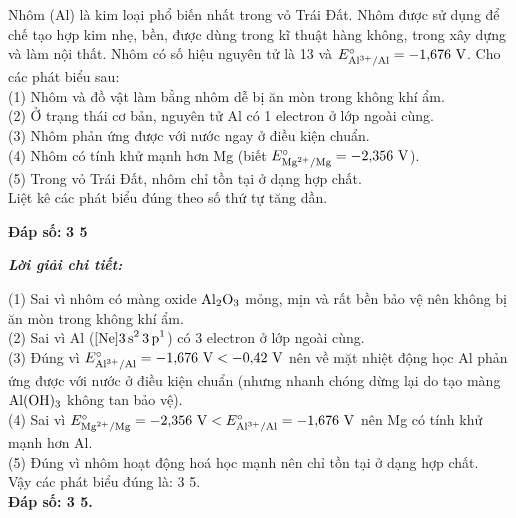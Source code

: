 \documentclass[11pt,a4paper]{article}
\def\loigiai#1{
\par\begingroup\color{blue!80!black}\small
\noindent\textbf{\textit{Lời giải chi tiết:}}\par
#1\par\endgroup}
\begin{document}
\begin{ex}
Nhôm (Al) là kim loại phổ biến nhất trong vỏ Trái Đất. Nhôm được sử dụng để chế tạo hợp kim nhẹ, bền, được dùng trong kĩ thuật hàng không, trong xây dựng và làm nội thất. Nhôm có số hiệu nguyên tử là 13 và $E^\circ_{\ce{Al^3+/Al}} = -1{,}676\text{ V}$. Cho các phát biểu sau:\\
(1) Nhôm và đồ vật làm bằng nhôm dễ bị ăn mòn trong không khí ẩm.\\
(2) Ở trạng thái cơ bản, nguyên tử Al có 1 electron ở lớp ngoài cùng.\\
(3) Nhôm phản ứng được với nước ngay ở điều kiện chuẩn.\\
(4) Nhôm có tính khử mạnh hơn Mg (biết $E^\circ_{\ce{Mg^2+/Mg}} = -2{,}356\text{ V}$).\\
(5) Trong vỏ Trái Đất, nhôm chỉ tồn tại ở dạng hợp chất.\\
Liệt kê các phát biểu đúng theo số thứ tự tăng dần.
\par\noindent\textbf{Đáp số:} \textbf{\color{red}3 5}
\loigiai{
(1) Sai vì nhôm có màng oxide $\ce{Al2O3}$ mỏng, mịn và rất bền bảo vệ nên không bị ăn mòn trong không khí ẩm.\\
(2) Sai vì Al ($[\ce{Ne}]\ce{3s^2 3p^1}$) có 3 electron ở lớp ngoài cùng.\\
(3) Đúng vì $E^\circ_{\ce{Al^3+/Al}} = -1{,}676\text{ V} < -0{,}42\text{ V}$ nên về mặt nhiệt động học Al phản ứng được với nước ở điều kiện chuẩn (nhưng nhanh chóng dừng lại do tạo màng $\ce{Al(OH)3}$ không tan bảo vệ).\\
(4) Sai vì $E^\circ_{\ce{Mg^2+/Mg}} = -2{,}356\text{ V} < E^\circ_{\ce{Al^3+/Al}} = -1{,}676\text{ V}$ nên Mg có tính khử mạnh hơn Al.\\
(5) Đúng vì nhôm hoạt động hoá học mạnh nên chỉ tồn tại ở dạng hợp chất.\\
Vậy các phát biểu đúng là: 3 5.\\
\textbf{Đáp số: 3 5.}}
\end{ex}
\end{document}
